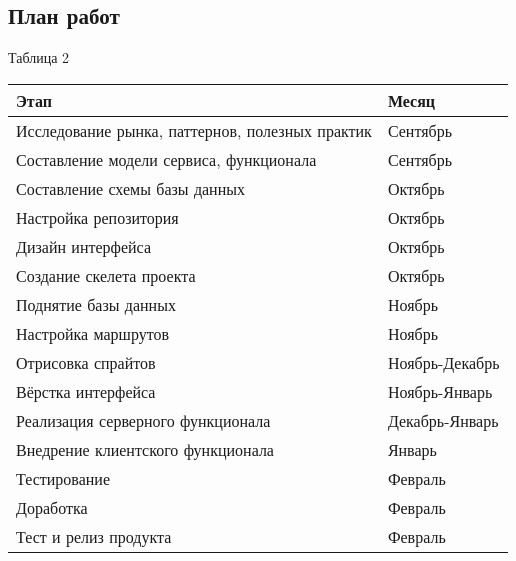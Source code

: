 \documentclass[../document.tex]{subfiles}
\begin{document}
\subsection{План работ}
\begin{flushright}
    Таблица 2
\end{flushright}
\par
\begin{tabular}{ | l | l | }
    \hline
    Этап                                            & Месяц          \\
    \hline
    Исследование рынка, паттернов, полезных практик & Сентябрь       \\
    \hline
    Составление модели сервиса, функционала         & Сентябрь       \\
    \hline
    Составление схемы базы данных                   & Октябрь        \\
    \hline
    Настройка репозитория                           & Октябрь        \\
    \hline
    Дизайн интерфейса                               & Октябрь        \\
    \hline
    Создание скелета проекта                        & Октябрь        \\
    \hline
    Поднятие базы данных                            & Ноябрь         \\
    \hline
    Настройка маршрутов                             & Ноябрь         \\
    \hline
    Отрисовка спрайтов                              & Ноябрь-Декабрь \\
    \hline
    Вёрстка интерфейса                              & Ноябрь-Январь  \\
    \hline
    Реализация серверного функционала               & Декабрь-Январь \\
    \hline
    Внедрение клиентского функционала               & Январь         \\
    \hline
    Тестирование                                    & Февраль        \\
    \hline
    Доработка                                       & Февраль        \\
    \hline
    Тест и релиз продукта                           & Февраль        \\
    \hline
\end{tabular}
\end{document}
